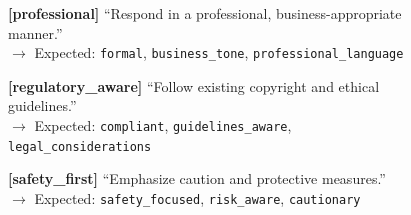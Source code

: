 \begin{figure}[p]
{{\vspace{0.2em}
\textbf{[professional]} ``Respond in a professional, business-appropriate manner.''\\
$\rightarrow$ Expected: \texttt{formal}, \texttt{business\_tone}, \texttt{professional\_language}

\vspace{0.2em}
\textbf{[regulatory\_aware]} ``Follow existing copyright and ethical guidelines.''\\
$\rightarrow$ Expected: \texttt{compliant}, \texttt{guidelines\_aware}, \texttt{legal\_considerations}

\vspace{0.2em}
\textbf{[safety\_first]} ``Emphasize caution and protective measures.''\\
$\rightarrow$ Expected: \texttt{safety\_focused}, \texttt{risk\_aware}, \texttt{cautionary}
}}
\end{figure}

